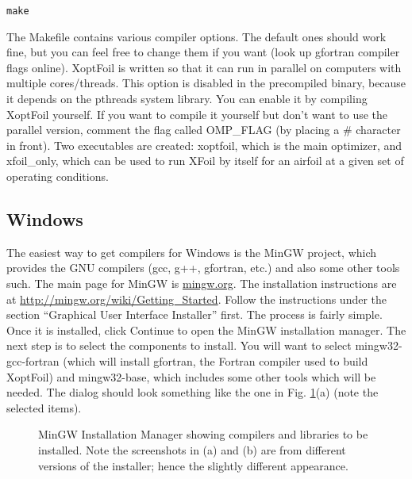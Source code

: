 \documentclass[11pt]{article}
\begin{document}
\begin{verbatim}
make
\end{verbatim}

The Makefile contains various compiler options.  The default ones should work fine, but
you can feel free to change them if you want (look up gfortran compiler flags online).
XoptFoil is written so that it can run in parallel on computers with multiple
cores/threads.  This option is disabled in the precompiled binary, because it depends on
the pthreads system library.  You can enable it by compiling XoptFoil yourself.  If you
want to compile it yourself but don't want to use the parallel version, comment the flag
called OMP\_FLAG (by placing a \# character in front). Two executables are
created: xoptfoil, which is the main optimizer, and xfoil\_only, which can be used to run 
XFoil by itself for an airfoil at a given set of operating conditions.

\subsection{Windows}\label{sec:compile_windows}

The easiest way to get compilers for Windows is the MinGW project, which provides the GNU
compilers (gcc, g++, gfortran, etc.) and also some other tools such.  The main page for
MinGW is \url{mingw.org}.  The installation instructions are at
\url{http://mingw.org/wiki/Getting_Started}.  Follow the instructions under the section
``Graphical User Interface Installer'' first.  The process is fairly simple.  Once it is
installed, click Continue to open the MinGW installation manager.  The next step is to
select the components to install.  You will want to select mingw32-gcc-fortran 
(which will install gfortran, the Fortran
compiler used to build XoptFoil) and mingw32-base, which includes some other tools
which will be needed.  The dialog should look something like the one in Fig.
\ref{fig:installmingw1}(a) (note the selected items).

\begin{figure}[!h]
\centering

   \caption{MinGW Installation Manager showing compilers and libraries to be installed.
Note the screenshots in (a) and (b) are from different versions of the installer; hence
the slightly different appearance.}
\label{fig:installmingw1}
\end{figure}
\end{document}

